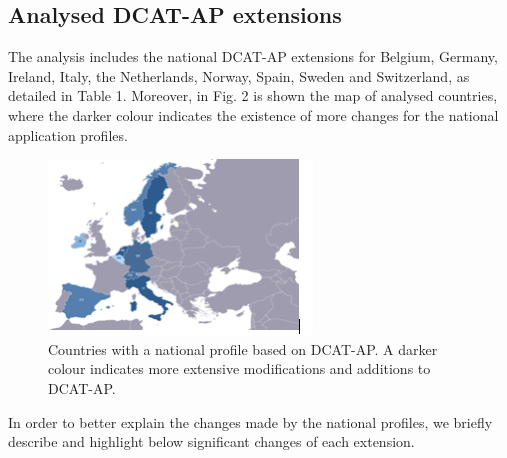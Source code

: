 \documentclass[<options>]{elsarticle}
\begin{document}
\subsection{Analysed DCAT-AP extensions}
The analysis includes the national DCAT-AP extensions for Belgium, Germany, Ireland, Italy, the Netherlands, Norway, Spain, Sweden and Switzerland, as detailed in Table 1. Moreover, in Fig. 2 is shown the map of analysed countries, where the darker colour indicates the existence of more changes for the national application profiles. 

\begin{figure}[H]
\includegraphics{replace2.png}
\caption{Countries with a national profile based on DCAT-AP. A darker colour indicates more extensive modifications and additions to DCAT-AP.}
\end{figure}

In order to better explain the changes made by the national profiles, we briefly describe and highlight below significant changes of each extension.
\end{document}
